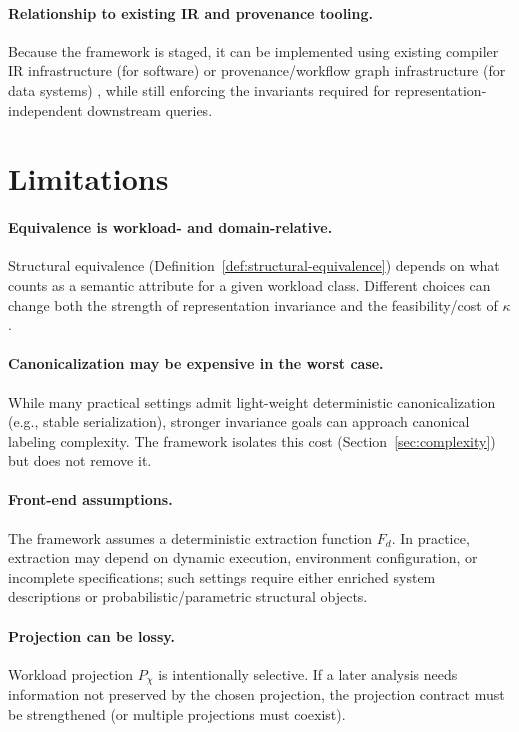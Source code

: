 \documentclass[11pt]{article}
\begin{document}
\paragraph{Relationship to existing IR and provenance tooling.}
Because the framework is staged, it can be implemented using existing compiler IR infrastructure (for software) \cite{llvmLangRef,mlirDoc} or provenance/workflow graph infrastructure (for data systems) \cite{w3cprov,deelman2009}, while still enforcing the invariants required for representation-independent downstream queries.

\section{Limitations}
\label{sec:limitations}

\paragraph{Equivalence is workload- and domain-relative.}
Structural equivalence (Definition~\ref{def:structural-equivalence}) depends on what counts as a semantic attribute for a given workload class. Different choices can change both the strength of representation invariance and the feasibility/cost of $\kappa$.

\paragraph{Canonicalization may be expensive in the worst case.}
While many practical settings admit light-weight deterministic canonicalization (e.g., stable serialization), stronger invariance goals can approach canonical labeling complexity. The framework isolates this cost (Section~\ref{sec:complexity}) but does not remove it.

\paragraph{Front-end assumptions.}
The framework assumes a deterministic extraction function $F_d$. In practice, extraction may depend on dynamic execution, environment configuration, or incomplete specifications; such settings require either enriched system descriptions or probabilistic/parametric structural objects.

\paragraph{Projection can be lossy.}
Workload projection $P_\chi$ is intentionally selective. If a later analysis needs information not preserved by the chosen projection, the projection contract must be strengthened (or multiple projections must coexist).
\end{document}

